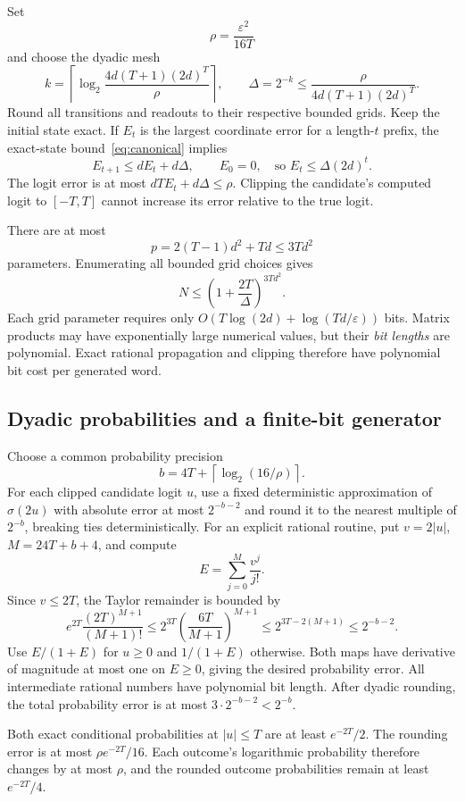 \documentclass[11pt]{article}
\newcommand{\sig}{\sigma}
\theoremstyle{definition}
\theoremstyle{remark}
\begin{document}
Set
\[
\rho=\frac{\varepsilon^2}{16T}
\]
and choose the dyadic mesh
\begin{equation}\label{eq:mesh}
k=\left\lceil\log_2\frac{4d(T+1)(2d)^T}{\rho}\right\rceil,
\qquad \Delta=2^{-k}\le\frac{\rho}{4d(T+1)(2d)^T}.
\end{equation}
Round all transitions and readouts to their respective bounded grids. Keep the initial state exact. If $E_t$ is the largest coordinate error for a length-$t$ prefix, the exact-state bound~\eqref{eq:canonical} implies
\[
E_{t+1}\le dE_t+d\Delta,\qquad E_0=0,
\quad\text{so }E_t\le\Delta(2d)^t.
\]
The logit error is at most $dTE_t+d\Delta\le\rho$. Clipping the candidate's computed logit to $[-T,T]$ cannot increase its error relative to the true logit.

There are at most
\[
p=2(T-1)d^2+Td\le3Td^2
\]
parameters. Enumerating all bounded grid choices gives
\begin{equation}\label{eq:coverN}
N\le\left(1+\frac{2T}{\Delta}\right)^{3Td^2}.
\end{equation}
Each grid parameter requires only $O(T\log(2d)+\log(Td/\varepsilon))$ bits. Matrix products may have exponentially large numerical values, but their \emph{bit lengths} are polynomial. Exact rational propagation and clipping therefore have polynomial bit cost per generated word.

\subsection{Dyadic probabilities and a finite-bit generator}

Choose a common probability precision
\[
b=4T+\left\lceil\log_2(16/\rho)\right\rceil.
\]
For each clipped candidate logit $u$, use a fixed deterministic approximation of $\sig(2u)$ with absolute error at most $2^{-b-2}$ and round it to the nearest multiple of $2^{-b}$, breaking ties deterministically. For an explicit rational routine, put $v=2|u|$, $M=24T+b+4$, and compute
\[
E=\sum_{j=0}^{M}\frac{v^j}{j!}.
\]
Since $v\le2T$, the Taylor remainder is bounded by
\[
e^{2T}\frac{(2T)^{M+1}}{(M+1)!}
\le2^{3T}\left(\frac{6T}{M+1}\right)^{M+1}
\le2^{3T-2(M+1)}\le2^{-b-2}.
\]
Use $E/(1+E)$ for $u\ge0$ and $1/(1+E)$ otherwise. Both maps have derivative of magnitude at most one on $E\ge0$, giving the desired probability error. All intermediate rational numbers have polynomial bit length. After dyadic rounding, the total probability error is at most $3\cdot2^{-b-2}<2^{-b}$.

Both exact conditional probabilities at $|u|\le T$ are at least $e^{-2T}/2$. The rounding error is at most $\rho e^{-2T}/16$. Each outcome's logarithmic probability therefore changes by at most $\rho$, and the rounded outcome probabilities remain at least $e^{-2T}/4$.
\end{document}
